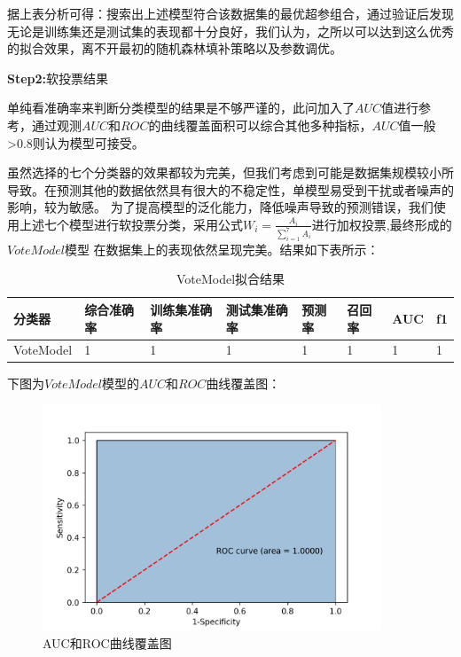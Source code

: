\documentclass[UTF8]{ctexart}
\begin{document}
据上表分析可得：搜索出上述模型符合该数据集的最优超参组合，通过验证后发现无论是训练集还是测试集的表现都十分良好，我们认为，之所以可以达到这么优秀的拟合效果，离不开最初的随机森林填补策略以及参数调优。

\textbf{Step2:}软投票结果

单纯看准确率来判断分类模型的结果是不够严谨的，此问加入了$AUC$值进行参考，通过观测$AUC$和$ROC$的曲线覆盖面积可以综合其他多种指标，$AUC$值一般>0.8则认为模型可接受。

虽然选择的七个分类器的效果都较为完美，但我们考虑到可能是数据集规模较小所导致。在预测其他的数据依然具有很大的不稳定性，单模型易受到干扰或者噪声的影响，较为敏感。
为了提高模型的泛化能力，降低噪声导致的预测错误，我们使用上述七个模型进行软投票分类，采用公式$W_i = \frac{A_i}{\sum_{i=1}^7 A_i}$进行加权投票,最终形成的$VoteModel$模型
在数据集上的表现依然呈现完美。结果如下表所示：

\begin{table}[H]
    \centering
	\caption{VoteModel拟合结果}
    \begin{tabular}{|l|l|l|l|l|l|l|l|}
    \hline
        分类器 &  综合准确率 & 训练集准确率 & 测试集准确率 & 预测率 & 召回率 & AUC & f1 \\ \hline
        VoteModel & 1 & 1 & 1 & 1 & 1 & 1 & 1 \\ \hline
    \end{tabular}
\end{table}

下图为$VoteModel$模型的$AUC$和$ROC$曲线覆盖图：

\begin{figure}[H]\centering
	\includegraphics[width=0.9\textwidth]{img/AUC.png} %
	\caption{AUC和ROC曲线覆盖图} %
	\label{fig:figure 10} %
\end{figure}
\end{document}
